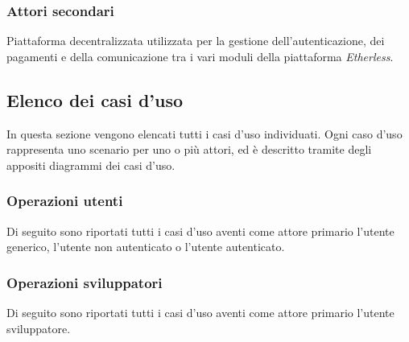 	\subsubsection{Attori secondari}
		\begin{description}[style=nextline]
			\item[\textbf{Ethereum network}]
				Piattaforma decentralizzata utilizzata per la gestione dell'autenticazione, dei pagamenti e della comunicazione tra i vari moduli della piattaforma \textit{Etherless}. 
		\end{description}
	\pagebreak
\subsection{Elenco dei casi d'uso}
In questa sezione vengono elencati tutti i casi d'uso individuati. Ogni caso d'uso rappresenta uno scenario per uno o più attori, ed è descritto tramite degli appositi diagrammi dei casi d'uso. 

\subsubsection*{Operazioni utenti}
Di seguito sono riportati tutti i casi d'uso aventi come attore primario l'utente generico, l'utente non autenticato o l'utente autenticato. 




\subsubsection*{Operazioni sviluppatori}
Di seguito sono riportati tutti i casi d'uso aventi come attore primario l'utente sviluppatore.


